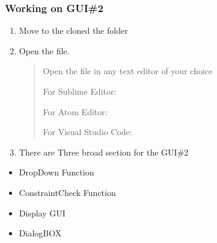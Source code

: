 \documentclass[letterpaper,10pt,english]{sphinxmanual}
\begin{document}
\subsubsection{Working on GUI\#2}
\label{\detokenize{developer:working-on-gui-2}}\begin{enumerate}
%
\item {} 
Move to the cloned the folder
\begin{quote}

\begin{sphinxVerbatim}[commandchars=\\\{\}]
 
\end{sphinxVerbatim}
\end{quote}

\item {} 
Open the  file.
\begin{quote}

Open the  file in any text editor of your choice

For Sublime Editor:

\begin{sphinxVerbatim}[commandchars=\\\{\}]
 
\end{sphinxVerbatim}

For Atom Editor:

\begin{sphinxVerbatim}[commandchars=\\\{\}]
 
\end{sphinxVerbatim}

For Visual Studio Code:

\begin{sphinxVerbatim}[commandchars=\\\{\}]
 
\end{sphinxVerbatim}
\end{quote}

\item {} 
There are Three broad section for the GUI\#2

\end{enumerate}
\begin{itemize}
\item {} 
DropDown Function

\item {} 
ConstraintCheck Function

\item {} 
Display GUI

\item {} 
DialogBOX

\end{itemize}
\end{document}
